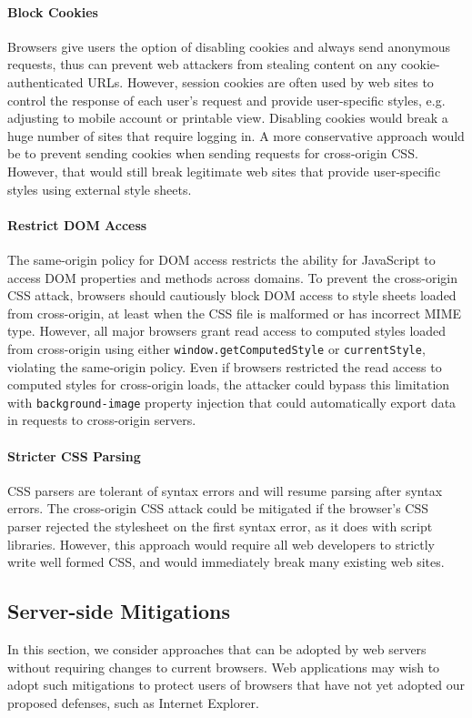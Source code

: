 \documentclass{acm_proc_article-sp}
\begin{document}
\paragraph{Block Cookies}
Browsers give users the option of disabling cookies and always send anonymous requests, thus can prevent web attackers from stealing content on any cookie-authenticated URLs. However, session cookies are often used by web sites to control the response of each user's request and provide user-specific styles, e.g. adjusting to mobile account or printable view. Disabling cookies would break a huge number of sites that require logging in. A more conservative approach would be to prevent sending cookies when sending requests for cross-origin CSS. However, that would still break legitimate web sites that provide user-specific styles using external style sheets.

\paragraph{Restrict DOM Access}
The same-origin policy for DOM access restricts the ability for JavaScript to access DOM properties and methods across domains. To prevent the cross-origin CSS attack, browsers should cautiously block DOM access to style sheets loaded from cross-origin, at least when the CSS file is malformed or has incorrect MIME type. However, all major browsers grant read access to computed styles loaded from cross-origin using either \texttt{window.getComputedStyle} or \texttt{currentStyle}, violating the same-origin policy. Even if browsers restricted the read access to computed styles for cross-origin loads, the attacker could bypass this limitation with \texttt{background-image} property injection that could automatically export data in requests to cross-origin servers.

\paragraph{Stricter CSS Parsing}
CSS parsers are tolerant of syntax errors and will resume parsing after syntax errors. The cross-origin CSS attack could be mitigated if the browser's CSS parser rejected the stylesheet on the first syntax error, as it does with script libraries. However, this approach would require all web developers to strictly write well formed CSS, and would immediately break many existing web sites.

\subsection{Server-side Mitigations}
In this section, we consider approaches that can be adopted by web servers
without requiring changes to current browsers. Web applications may wish to
adopt such mitigations to protect users of browsers that have not yet adopted
our proposed defenses, such as Internet Explorer.
\end{document}
